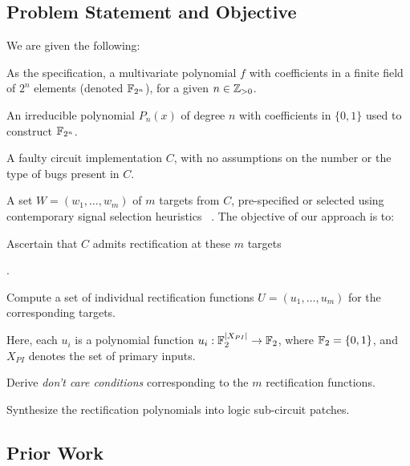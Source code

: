 \subsection{Problem Statement and Objective}
We are given the following: 
\bi
\item As the specification, a multivariate
polynomial $f$ with coefficients in a finite field of $2^n$ elements
(denoted ${\mathbb{F}}_{2^n}$), for a given  $n\in {\mathbb{Z}}_{> 0}$.
\item An irreducible
polynomial $P_n(x)$ of degree $n$ with coefficients in $\{0,1\}$ used 
to construct ${\mathbb{F}}_{2^n}$.
\item A faulty circuit implementation $C$,
with no assumptions on the number or the type of bugs present in
$C$. 
\item A set $W = (w_1,\dots,w_m)$ of $m$ targets from $C$,
pre-specified or selected using contemporary signal selection heuristics 
~\cite{SS_Alan:DAC18,SS_Fujita:ISCAS19,SS_Roland:DAC19}.
\ei
The objective of our approach is to: 
\bi
{\red \item Ascertain that $C$ 
admits rectification at these $m$ targets}.
\item Compute a set
of individual rectification functions $U =
(u_1,\dots,u_m)$ for the corresponding targets. 
\bi 
\item Here, each $u_i$ is a 
polynomial function $u_i:{\mathbb{F}}_2^{|X_{PI}|}\rightarrow{\mathbb{F}}_2$, where ${\mathbb{F}}_2=\{0,1\}$, 
and $X_{PI}$ denotes the set of primary inputs.
\ei
\item Derive {\it don't care conditions}
corresponding to the $m$ rectification functions. 
\item Synthesize
the rectification polynomials into logic sub-circuit patches.
\ei

\subsection{Prior Work}

